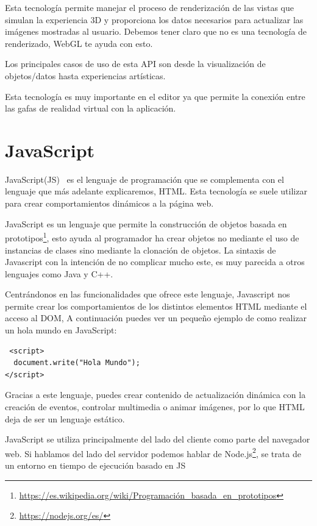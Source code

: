 \documentclass[a4paper, 12pt]{book}
\begin{document}
Esta tecnología permite manejar el proceso de renderización de las vistas que simulan la experiencia 3D y proporciona los datos necesarios para actualizar las imágenes mostradas al usuario. Debemos tener claro que no es una tecnología de renderizado, WebGL te ayuda con esto.

Los principales casos de uso de esta API son desde la visualización de objetos/datos hasta experiencias artísticas. 

Esta tecnología es muy importante en el editor ya que permite la conexión entre las gafas de realidad virtual con la aplicación.

\section{JavaScript} %
\label{sec:JavaScript}

JavaScript(JS)~\cite{eloquent} es el lenguaje de programación que se complementa con el lenguaje que más adelante explicaremos, HTML. Esta tecnología se suele utilizar para crear comportamientos dinámicos a la página web.

JavaScript es un lenguaje que permite la construcción de objetos basada en prototipos\footnote{\url{https://es.wikipedia.org/wiki/Programación_basada_en_prototipos}}, esto ayuda al programador ha crear objetos no mediante el uso de  instancias de clases sino mediante la clonación de objetos. La sintaxis de Javascript con la intención de no complicar mucho este, es muy parecida a otros lenguajes como Java y C++.

Centrándonos en las funcionalidades que ofrece este lenguaje, Javascript nos permite crear los comportamientos de los distintos elementos  HTML mediante el acceso al DOM, A continuación puedes ver un pequeño ejemplo de como realizar un hola mundo en JavaScript:

\begin{verbatim}
 <script>
  document.write("Hola Mundo");
</script>   
\end{verbatim}

Gracias a este lenguaje, puedes crear contenido de actualización dinámica con la creación de eventos, controlar multimedia o animar imágenes, por lo que HTML deja de ser un lenguaje estático.

JavaScript se utiliza principalmente del lado del cliente como parte del navegador web. Si hablamos del lado del servidor podemos hablar de Node.js\footnote{\url{https://nodejs.org/es/}}, se trata de un entorno  en tiempo de ejecución basado en JS
\end{document}
